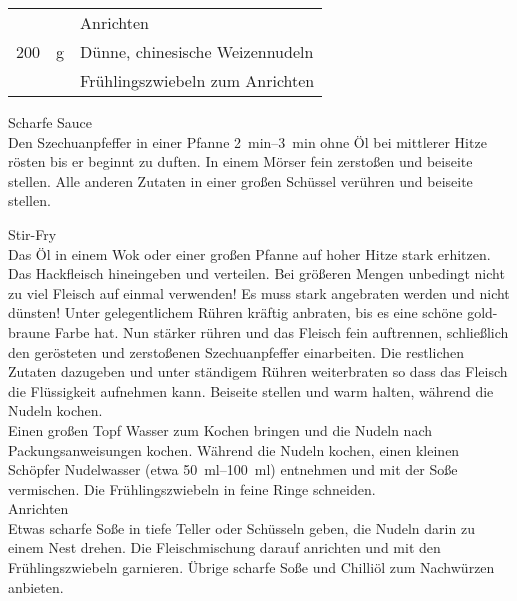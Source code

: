 \vspace{0.3cm}

\begin{tabular}{ R{1cm}@{\,}L{1cm} L{10cm}}
& & {\large Anrichten}\vspace{0.1cm} \\
200    &  \si{\gram}         &  Dünne, chinesische Weizennudeln  \\
       &                 &  Frühlingszwiebeln zum Anrichten  \\
\end{tabular}
\vspace{1cm}

{\large Scharfe Sauce}\vspace{0.1cm}\\
Den Szechuanpfeffer in einer Pfanne \SIrange{2}{3}{\minute} ohne Öl bei mittlerer Hitze rösten bis er beginnt zu duften.
In einem Mörser fein zerstoßen und beiseite stellen. Alle anderen Zutaten in einer großen Schüssel verühren und beiseite stellen.

{\large Stir-Fry}\vspace{0.1cm}\\
Das Öl in einem Wok oder einer großen Pfanne auf hoher Hitze stark erhitzen. Das Hackfleisch hineingeben und verteilen.
Bei größeren Mengen unbedingt nicht zu viel Fleisch auf einmal verwenden! Es muss stark angebraten werden und nicht dünsten!
Unter gelegentlichem Rühren kräftig anbraten, bis es eine schöne gold-braune Farbe hat. Nun stärker rühren und das Fleisch fein
auftrennen, schließlich den gerösteten und zerstoßenen Szechuanpfeffer einarbeiten. Die restlichen Zutaten dazugeben und unter
ständigem Rühren weiterbraten so dass das Fleisch die Flüssigkeit aufnehmen kann. Beiseite stellen und warm halten, während die Nudeln kochen.  \\

Einen großen Topf Wasser zum Kochen bringen und die Nudeln nach Packungsanweisungen kochen. Während die Nudeln kochen, einen kleinen Schöpfer
Nudelwasser (etwa \SIrange{50}{100}{\milli\litre}) entnehmen und mit der Soße vermischen. Die Frühlingszwiebeln in feine Ringe schneiden.  \\

{\large Anrichten}\vspace{0.1cm}\\
Etwas scharfe Soße in tiefe Teller oder Schüsseln geben, die Nudeln darin zu einem Nest drehen.
Die Fleischmischung darauf anrichten und mit den Frühlingszwiebeln garnieren. Übrige scharfe Soße und Chilliöl
zum Nachwürzen anbieten.


